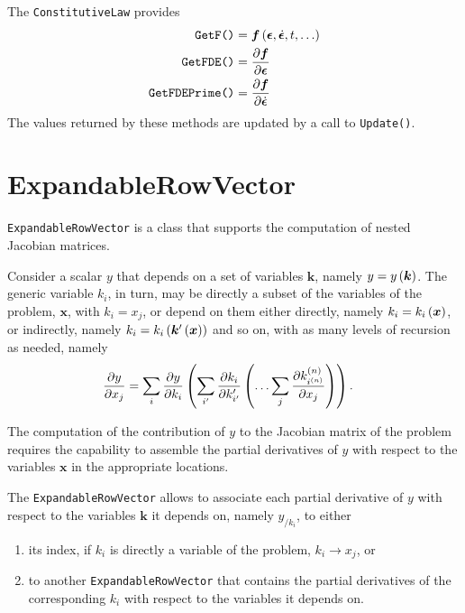 \documentclass[10pt,dvips,fleqn,subeqn]{report}
\newcommand{\T}[1]{\bm{#1}}
\begin{document}
The \texttt{ConstitutiveLaw} provides
\begin{subequations}
\begin{align}
	\texttt{GetF()}
	&=
	\T{f}\plbr{ \T{\epsilon}, \dot{\T{\epsilon}}, t, \ldots }
	\\
	\texttt{GetFDE()}
	&=
	\frac{\partial \T{f}}{\partial \T{\epsilon}}
	\\
	\texttt{GetFDEPrime()}
	&=
	\frac{\partial \T{f}}{\partial \dot{\T{\epsilon}}}
\end{align}
\end{subequations}
The values returned by these methods are updated by a call to
\texttt{Update()}.



\section{ExpandableRowVector}
\texttt{ExpandableRowVector} is a class that supports
the computation of nested Jacobian matrices.

Consider a scalar $y$  that depends on a set of variables $\T{k}$,
namely $y=y\plbr{\T{k}}$.
The generic variable $k_i$, in turn, may be directly a subset of the variables
of the problem, $\T{x}$, with $k_i=x_j$, or depend on them either directly,
namely $k_i=k_i\plbr{\T{x}}$, or indirectly,
namely $k_i=k_i\plbr{\T{k}'\plbr{\T{x}}}$ and so on,
with as many levels of recursion as needed, namely
\begin{align}
	\frac{\partial y}{\partial x_j}
	&=
	\sum_{i} \frac{\partial y}{\partial k_i}\left( 
		\sum_{i'} \frac{\partial k_i}{\partial k'_{i'}}\left( 
			\ldots
			\sum_{j} \frac{\partial k^{(n)}_{i^{(n)}}}{\partial x_j}
		 \right)
	 \right)
	.
\end{align}

The computation of the contribution of $y$ to the Jacobian matrix
of the problem requires the capability to assemble the partial derivatives
of $y$ with respect to the variables $\T{x}$ in the appropriate locations.

The \texttt{ExpandableRowVector} allows to associate each partial derivative
of $y$ with respect to the variables $\T{k}$ it depends on, namely $y_{/k_i}$,
to either 
\begin{enumerate}
\renewcommand{\labelenumi}{\alph{enumi})}
\item its index, if $k_i$ is directly a variable of the problem,
$k_i\rightarrow x_j$, or
\item to another \texttt{ExpandableRowVector} that contains
the partial derivatives of the corresponding $k_i$ with respect
to the variables it depends on.
\end{enumerate}
\end{document}
